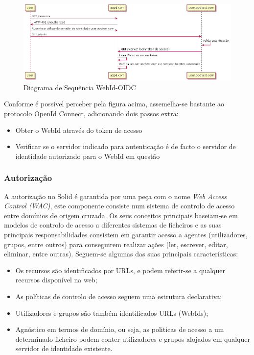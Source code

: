 \begin{figure}[h]
    \begin{center}
    \includegraphics[width=1 \textwidth]{figures/WedId-OIDC.png}
    \caption{Diagrama de Sequência WebId-OIDC}
    \end{center}
\end{figure}

\pagebreak

Conforme é possível perceber pela figura acima, assemelha-se bastante ao protocolo OpenId Connect, adicionando dois passos extra:\cite{solid_webid_oidc}
\begin{itemize}
    \item Obter o WebId através do token de acesso
    \item Verificar se o servidor indicado para autenticação é de facto o servidor de identidade autorizado para o WebId em questão
\end{itemize}

\subsubsection{Autorização}
A autorização no Solid é garantida por uma peça com o nome \emph{Web Access Control (WAC)}, este componente consiste num sistema de controlo de acesso entre domínios de origem cruzada. Os seus conceitos principais baseiam-se em modelos de controlo de acesso a diferentes sistemas de ficheiros e as suas principais responsabilidades consistem em garantir acesso a agentes (utilizadores, grupos, entre outros) para conseguirem realizar ações (ler, escrever, editar, eliminar, entre outras).\cite{solid_web_access_control}
Seguem-se algumas das suas principais características:
\begin{itemize}
    \item Os recursos são identificados por URLs, e podem referir-se a qualquer recursos disponível na web;
    \item As políticas de controlo de acesso seguem uma estrutura declarativa;
    \item Utilizadores e grupos são também identificados URLs (WebIds);
    \item Agnóstico em termos de domínio, ou seja, as politicas de acesso a um determinado ficheiro podem conter utilizadores e grupos alojados em qualquer servidor de identidade existente.
\end{itemize}


